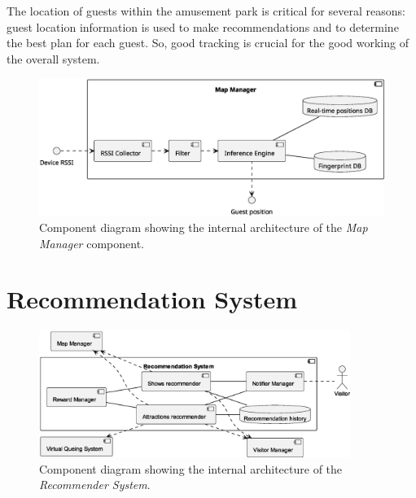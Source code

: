 The location of guests within the amusement park is critical for several reasons: guest location information is used to make recommendations and to
determine the best plan for each guest. So, good tracking is crucial for the good working of the overall system.

\begin{figure}[H]
	\centering
	\includegraphics[width=\textwidth]{img/map-manager.eps}
	\caption{Component diagram showing the internal architecture of the \textit{Map Manager} component.
	}
	\label{fig:map-manager}
\end{figure}

\section{Recommendation System}

\begin{figure}[H]
	\centering
	\includegraphics[width=0.9\textwidth]{img/recommender.eps}
	\caption{Component diagram showing the internal architecture of the \textit{Recommender System}.
	}
	\label{fig:recommender-arch}
\end{figure}

